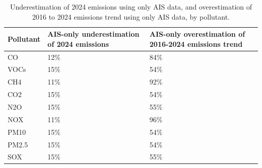 \begin{table}[!h]
\centering
\caption{\label{tab:pollutant_ais_underestimation_overestimation_summary}Underestimation of 2024 emissions using only AIS data, and overestimation of 2016 to 2024 emissions trend using only AIS data, by pollutant.}
\centering
\fontsize{8}{10}\selectfont
\begin{tabular}[t]{l|l|l}
\hline
Pollutant & AIS-only underestimation of 2024 emissions & AIS-only overestimation of 2016-2024 emissions trend\\
\hline
CO & 12\% & 84\%\\
\hline
VOCs & 15\% & 54\%\\
\hline
CH4 & 11\% & 92\%\\
\hline
CO2 & 15\% & 54\%\\
\hline
N2O & 15\% & 55\%\\
\hline
NOX & 11\% & 96\%\\
\hline
PM10 & 15\% & 54\%\\
\hline
PM2.5 & 15\% & 54\%\\
\hline
SOX & 15\% & 55\%\\
\hline
\end{tabular}
\end{table}
